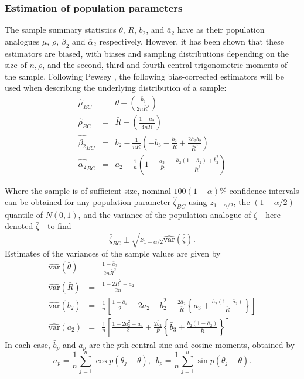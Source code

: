 \documentclass[../../ArchStats.tex]{subfiles}
\begin{document}
\subsubsection{Estimation of population parameters}
\label{sec:bias-corrected}
The sample summary statistics $\bar{\theta}$, $\bar{R}$, $\bar{b}_2$, and $\bar{a}_2$ have as their population analogues $\mu$, $\rho$, $\bar{\beta}_2$ and $\bar{\alpha}_2$ respectively. However, it has been shown \cite{Pewsey2004b} that these estimators are biased, with biases and sampling distributions depending on the size of $n, \rho$, and the second, third and fourth central trigonometric moments of the sample. Following Pewsey \cite{Pewsey2014}, the following bias-corrected estimators will be used when describing the underlying distribution of a sample:
	\begin{eqnarray}
	\hat{\mu}_{BC} &=& \bar{\theta} + \left(\frac{\bar{b}_2}{2n\bar{R}^2} \right)\\[5pt]
	\hat{\rho}_{BC} &=& \bar{R} - \left(\frac{1-\bar{a}_2}{4n\bar{R}}\right)\\[5pt]
	\widehat{\bar{\beta}_2}_{BC} &=& \bar{b}_2 - \frac{1}{n\bar{R}} \left(-\bar{b}_3 - \frac{\bar{b}_2}{\bar{R}} + \frac{2\bar{a}_2\bar{b}_2}{\bar{R}^3}\right)\\[5pt]
	\widehat{\bar{\alpha}_2}_{BC} &=& \bar{a}_2 - \frac{1}{n} \left(1-\frac{\bar{a}_3}{\bar{R}}-\frac{\bar{a}_2(1-\bar{a}_2) + \bar{b}_2^2}{\bar{R}^2}\right)
	\end{eqnarray}

Where the sample is of sufficient size, nominal $100(1-\alpha)\%$ confidence intervals can be obtained for any population parameter $\hat{\zeta}_{BC}$ using $z_{1-\alpha/2}$, the $(1-\alpha/2)$-quantile of $N(0,1)$, and the variance of the population analogue of $\zeta$ - here denoted $\bar{\zeta}$ - to find
\begin{equation}
\bar{\zeta}_{BC} \pm \sqrt{z_{1-\alpha/2} \widehat{\text{var}}(\bar{\zeta})}. \end{equation}
Estimates of the variances of the sample values are given by
	\begin{eqnarray}
	\widehat{\text{var}}(\bar{\theta}) &=& \frac{1-\bar{a}_2}{2n\bar{R}^2} \\[5pt]
	\widehat{\text{var}}(\bar{R}) &=& \frac{1-2\bar{R}^2 + \bar{a}_2}{2n} \\[5pt]
	\label{eqn:var-b-2}
	\widehat{\text{var}}(\bar{b}_2) &=& \frac{1}{n}\left[ \frac{1-\bar{a}_4}{2} - 2\bar{a}_2 - \bar{b}_2^2 + \frac{2\bar{a}_2}{\bar{R}} \left\lbrace \bar{a}_3 + \frac{\bar{a}_2 (1-\bar{a}_2)}{\bar{R}} \right\rbrace \right] \\[5pt]
	\widehat{\text{var}}(\bar{a}_2) &=& \frac{1}{n}\left[ \frac{1-2\bar{a}_2^2 + \bar{a}_4}{2} + \frac{2\bar{b}_2}{\bar{R}} \left\lbrace \bar{b}_3 + \frac{\bar{b}_2 (1-\bar{a}_2)}{\bar{R}} \right\rbrace \right]
	\end{eqnarray}
In each case, $\bar{b}_p$ and $\bar{a}_p$ are the $p$th central sine and cosine moments, obtained by 
	\begin{equation}
	\bar{a}_p = \frac{1}{n} \sum_{j=1}^n \cos p(\theta_j-\bar{\theta}), \, \, \, 
\bar{b}_p = \frac{1}{n} \sum_{j=1}^n \sin p(\theta_j-\bar{\theta}).
	\end{equation}
\end{document}
